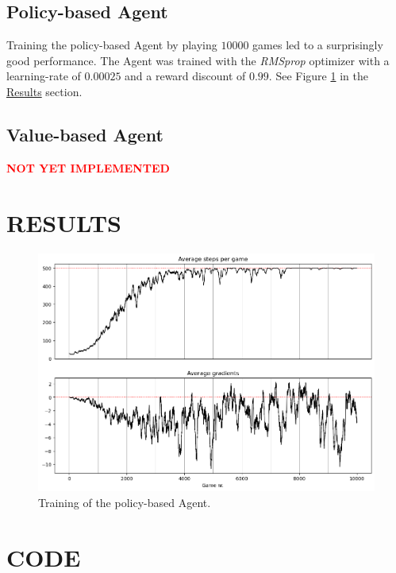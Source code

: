 \documentclass{article}
\renewenvironment{leftbar}[1][\hsize]{
    \def\FrameCommand{{\color{barcolor}\vrule width 0.5pt \hspace{10pt}}}
    \MakeFramed{\hsize#1 \advance\hsize-\width \FrameRestore}
}{\endMakeFramed}
\begin{document}
\subsection*{Policy-based Agent}
\begin{leftbar}
    Training the policy-based Agent by playing $10 000$ games led to a surprisingly good performance. The Agent was trained with the \textit{RMSprop} optimizer with a learning-rate of $0.00025$ and a reward discount of $0.99$. See Figure \ref{fig:policy-based-metrics} in the \hyperlink{sec:results}{Results} section.
\end{leftbar}
\subsection*{Value-based Agent}
\begin{leftbar}
    \textbf{\textcolor{red}{NOT YET IMPLEMENTED}}
\end{leftbar}

\newpage
\printbibliography

\newpage
\hypertarget{sec:results}{}
\section*{RESULTS}

\begin{figure}[h]
    \centering
    \includegraphics[width=15cm]{images/policy-based-metrics.png}
    \caption{Training of the policy-based Agent.}
    \label{fig:policy-based-metrics}
\end{figure}

\newpage
\hypertarget{sec:code}{}
\section*{CODE}
\end{document}
